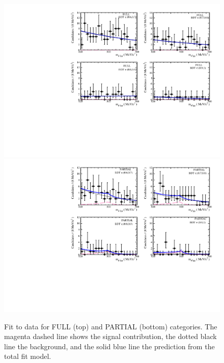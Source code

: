 \begin{figure} [htb!]
\begin{center}
\includegraphics[scale=0.60]{figs/Kspi0MuMu/fit_FULL.pdf}
\includegraphics[scale=0.60]{figs/Kspi0MuMu/fit_PARTIAL.pdf}

\caption{Fit to data for FULL (top) and PARTIAL (bottom) categories. The magenta dashed line shows the signal contribution, the dotted black line the background, and the solid blue line the prediction from the total fit
model.
\label{fig:fit}}
\end{center}

\end{figure}



